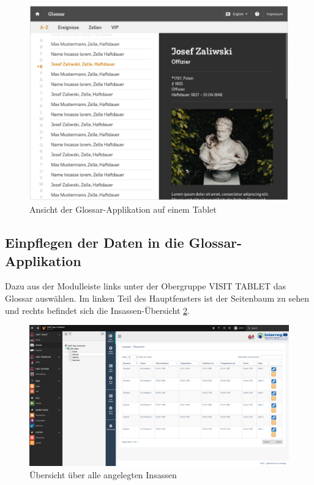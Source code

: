 \begin{figure}[ht!]
\centering
\includegraphics[width=12cm]{Figures/paula/glossar/glossar_anfang.png}
\caption{Ansicht der Glossar-Applikation auf einem Tablet}
\label{img:glossar}
\end{figure}


\subsection{Einpflegen der Daten in die Glossar-Applikation}

Dazu aus der Modulleiste links unter der Obergruppe VISIT TABLET das Glossar auswählen. Im linken Teil des Hauptfensters ist der Seitenbaum zu sehen und rechts befindet sich die Insassen-Übersicht \ref{img:uebersicht_glossar}.

\begin{figure}[ht!]
\centering
\includegraphics[width=12cm]{Figures/paula/glossar/uebersicht_insassen.png}
\caption{Übersicht über alle angelegten Insassen}
\label{img:uebersicht_glossar}
\end{figure}


